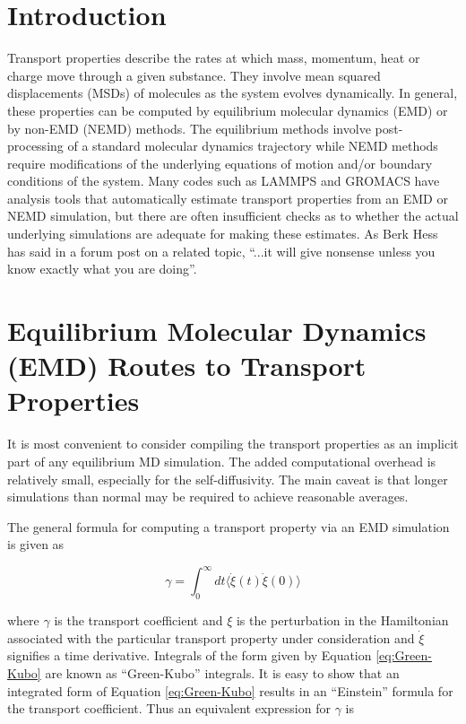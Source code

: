 \documentclass[9pt]{livecoms}
\begin{document}
\section{Introduction}

Transport properties describe the rates at which mass, momentum, heat or charge move through a given substance. They involve mean squared displacements (MSDs) of molecules as the system evolves dynamically. In general, these properties can be computed by equilibrium molecular dynamics (EMD) or by non-EMD (NEMD) methods. The equilibrium methods involve post-processing of a standard molecular dynamics trajectory while NEMD methods require modifications of the underlying equations of motion and/or boundary conditions of the system. Many codes such as LAMMPS and GROMACS have analysis tools that automatically estimate transport properties from an EMD or NEMD simulation, but there are often insufficient checks as to whether the actual underlying simulations are adequate for making these estimates. As Berk Hess has said in a forum post on a related topic, ``...it will give nonsense unless you know exactly what you are doing''. %

\section{Equilibrium Molecular Dynamics (EMD) Routes to Transport Properties}

It is most convenient to consider compiling the transport properties as an implicit part of any equilibrium MD simulation. The added computational overhead is relatively small, especially for the self-diffusivity. The main caveat is that longer simulations than normal may be required to achieve reasonable averages. 

The general formula for computing a transport property via an EMD simulation is given as

\begin{equation} \label{eq:Green-Kubo}
\gamma = \int_{0}^{\infty}dt\langle\dot{\xi}(t)\dot{\xi}(0)\rangle
\end{equation}

where $\gamma$ is the transport coefficient and $\xi$ is the perturbation in the Hamiltonian associated with the particular transport property under consideration and $\dot{\xi}$ signifies a time derivative. Integrals of the form given by Equation \ref{eq:Green-Kubo} are known as “Green-Kubo” integrals. It is easy to show that an integrated form of Equation \ref{eq:Green-Kubo} results in an “Einstein” formula for the transport coefficient. Thus an equivalent expression for $\gamma$ is
\end{document}
